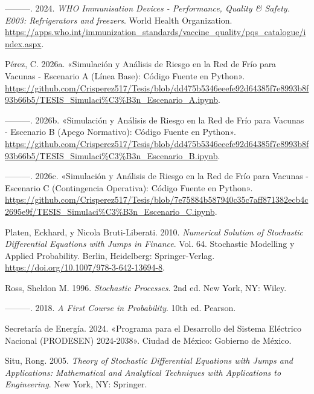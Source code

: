 \documentclass[
  spanish,
  us-letterpaper,
]{scrreprt}
\newlength{\cslhangindent}
\newenvironment{CSLReferences}[2] %
 {\begin{list}{}{%
  \setlength{\itemindent}{0pt}
  \setlength{\leftmargin}{0pt}
  \setlength{\parsep}{0pt}
  \ifodd #1
   \setlength{\leftmargin}{\cslhangindent}
   \setlength{\itemindent}{-1\cslhangindent}
  \fi
  \setlength{\itemsep}{#2\baselineskip}}}
 {\end{list}}
\numberwithin{equation}{section}
\theoremstyle{plain}
\theoremstyle{plain}
\theoremstyle{definition}
\theoremstyle{plain}
\theoremstyle{remark}
\begin{document}
\begin{CSLReferences}{1}{0}
---------. 2024. \emph{WHO Immunisation Devices - Performance, Quality
\& Safety. E003: Refrigerators and freezers}. World Health Organization.
\url{https://apps.who.int/immunization_standards/vaccine_quality/pqs_catalogue/index.aspx}.

Pérez, C. 2026a. {«Simulación y Análisis de Riesgo en la Red de Frío
para Vacunas - Escenario A (Línea Base): Código Fuente en Python»}.
\url{https://github.com/Crisperez517/Tesis/blob/dd475b5346eeefe92d64385f7e8993b8f93b66b5/TESIS_Simulaci\%C3\%B3n_Escenario_A.ipynb}.

---------. 2026b. {«Simulación y Análisis de Riesgo en la Red de Frío
para Vacunas - Escenario B (Apego Normativo): Código Fuente en Python»}.
\url{https://github.com/Crisperez517/Tesis/blob/dd475b5346eeefe92d64385f7e8993b8f93b66b5/TESIS_Simulaci\%C3\%B3n_Escenario_B.ipynb}.

---------. 2026c. {«Simulación y Análisis de Riesgo en la Red de Frío
para Vacunas - Escenario C (Contingencia Operativa): Código Fuente en
Python»}.
\url{https://github.com/Crisperez517/Tesis/blob/7e75884b587940c35c7aff871382ecb4c2695e9f/TESIS_Simulaci\%C3\%B3n_Escenario_C.ipynb}.

Platen, Eckhard, y Nicola Bruti-Liberati. 2010. \emph{Numerical Solution
of Stochastic Differential Equations with Jumps in Finance}. Vol. 64.
Stochastic Modelling y Applied Probability. Berlin, Heidelberg:
Springer-Verlag. \url{https://doi.org/10.1007/978-3-642-13694-8}.

Ross, Sheldon M. 1996. \emph{Stochastic Processes}. 2nd ed. New York,
NY: Wiley.

---------. 2018. \emph{A First Course in Probability}. 10th ed. Pearson.

Secretaría de Energía. 2024. {«Programa para el Desarrollo del Sistema
Eléctrico Nacional (PRODESEN) 2024-2038»}. Ciudad de México: Gobierno de
México.

Situ, Rong. 2005. \emph{Theory of Stochastic Differential Equations with
Jumps and Applications: Mathematical and Analytical Techniques with
Applications to Engineering}. New York, NY: Springer.


\end{CSLReferences}
\end{document}

